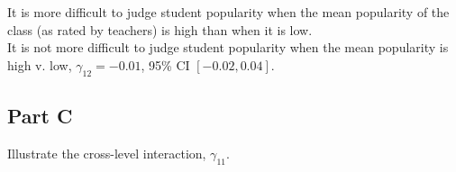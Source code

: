 \documentclass[]{article}
\newenvironment{Shaded}{\begin{snugshade}}{\end{snugshade}}
\newcommand{\KeywordTok}[1]{\textcolor[rgb]{0.13,0.29,0.53}{\textbf{#1}}}
\newcommand{\DataTypeTok}[1]{\textcolor[rgb]{0.13,0.29,0.53}{#1}}
\newcommand{\DecValTok}[1]{\textcolor[rgb]{0.00,0.00,0.81}{#1}}
\newcommand{\StringTok}[1]{\textcolor[rgb]{0.31,0.60,0.02}{#1}}
\newcommand{\CommentTok}[1]{\textcolor[rgb]{0.56,0.35,0.01}{\textit{#1}}}
\newcommand{\OperatorTok}[1]{\textcolor[rgb]{0.81,0.36,0.00}{\textbf{#1}}}
\newcommand{\NormalTok}[1]{#1}
\begin{document}
It is more difficult to judge student popularity when the mean
popularity of the class (as rated by teachers) is high than when it is
low.\\
It is not more difficult to judge student popularity when the mean
popularity is high v. low, \(\gamma_{12} = -0.01\), 95\% CI
\([-0.02, 0.04]\).

\subsection{Part C}\label{part-c-1}

Illustrate the cross-level interaction, \(\gamma_{11}\).

\begin{Shaded}
\end{Shaded}
\end{document}
